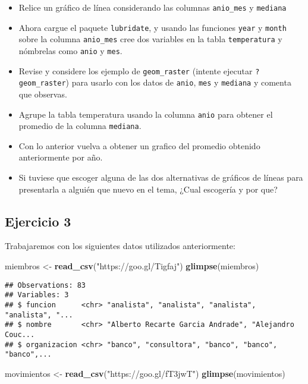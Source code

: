 \documentclass[]{article}
\newenvironment{Shaded}{\begin{snugshade}}{\end{snugshade}}
\newcommand{\KeywordTok}[1]{\textcolor[rgb]{0.13,0.29,0.53}{\textbf{#1}}}
\newcommand{\StringTok}[1]{\textcolor[rgb]{0.31,0.60,0.02}{#1}}
\newcommand{\NormalTok}[1]{#1}
\providecommand{\tightlist}{%
  \setlength{\itemsep}{0pt}\setlength{\parskip}{0pt}}
\begin{document}
\begin{itemize}
\tightlist
\item
  Relice un gráfico de línea considerando las columnas
  \texttt{anio\_mes} y \texttt{mediana}
\item
  Ahora cargue el paquete \texttt{lubridate}, y usando las funciones
  \texttt{year} y \texttt{month} sobre la columna \texttt{anio\_mes}
  cree dos variables en la tabla \texttt{temperatura} y nómbrelas como
  \texttt{anio} y \texttt{mes}.
\item
  Revise y considere los ejemplo de \texttt{geom\_raster} (intente
  ejecutar \texttt{?geom\_raster}) para usarlo con los datos de
  \texttt{anio}, \texttt{mes} y \texttt{mediana} y comenta que observas.
\item
  Agrupe la tabla temperatura usando la columna \texttt{anio} para
  obtener el promedio de la columna \texttt{mediana}.
\item
  Con lo anterior vuelva a obtener un grafico del promedio obtenido
  anteriormente por año.
\item
  Si tuviese que escoger alguna de las dos alternativas de gráficos de
  líneas para presentarla a alguién que nuevo en el tema, ¿Cual
  escogería y por que?
\end{itemize}

\subsection{Ejercicio 3}\label{ejercicio-3}

Trabajaremos con los siguientes datos utilizados anteriormente:

\begin{Shaded}
\begin{Highlighting}[]
\NormalTok{miembros <-}\StringTok{ }\KeywordTok{read_csv}\NormalTok{(}\StringTok{"https://goo.gl/Tigfaj"}\NormalTok{)}
\KeywordTok{glimpse}\NormalTok{(miembros)}
\end{Highlighting}
\end{Shaded}

\begin{verbatim}
## Observations: 83
## Variables: 3
## $ funcion      <chr> "analista", "analista", "analista", "analista", "...
## $ nombre       <chr> "Alberto Recarte Garcia Andrade", "Alejandro Couc...
## $ organizacion <chr> "banco", "consultora", "banco", "banco", "banco",...
\end{verbatim}

\begin{Shaded}
\begin{Highlighting}[]
\NormalTok{movimientos <-}\StringTok{ }\KeywordTok{read_csv}\NormalTok{(}\StringTok{"https://goo.gl/fT3jwT"}\NormalTok{)}
\KeywordTok{glimpse}\NormalTok{(movimientos)}
\end{Highlighting}
\end{Shaded}
\end{document}
